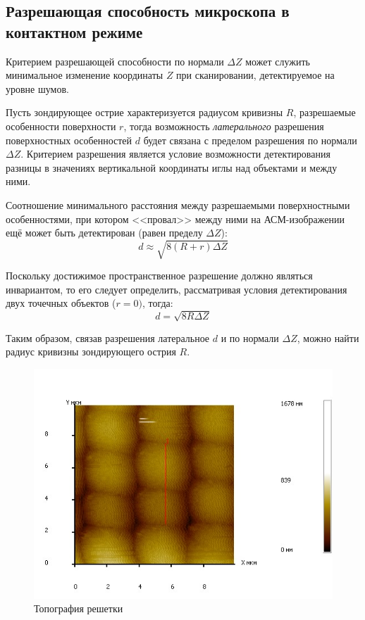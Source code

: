 \documentclass[a4paper, 12pt]{article}
\begin{document}
	\subsection{Разрешающая способность микроскопа в контактном режиме}
	Критерием разрешающей способности по нормали $\Delta Z$ может служить минимальное изменение координаты $Z$ при сканировании, детектируемое на уровне шумов.\par
	Пусть зондирующее острие характеризуется радиусом кривизны $R$, разрешаемые особенности поверхности $r$, тогда возможность \textit{латерального} разрешения поверхностных особенностей $d$ будет связана с пределом разрешения по нормали $\Delta Z$. Критерием разрешения является условие возможности детектирования разницы в значениях вертикальной координаты иглы над объектами и между ними.\par
	Соотношение минимального расстояния между разрешаемыми поверхностными особенностями, при котором <<провал>> между ними на АСМ-изображении ещё может быть детектирован (равен пределу $\Delta Z$):
	\begin{equation*}
		d\approx\sqrt{8(R+r)\Delta Z}
	\end{equation*}
	\par
	Поскольку достижимое пространственное разрешение должно являться инвариантом, то его следует определить, рассматривая условия детектирования двух точечных объектов ($r = 0)$, тогда:
	\begin{equation*}
		d=\sqrt{8R\Delta Z}
	\end{equation*}
	\par
	Таким образом, связав разрешения латеральное $d$ и по нормали $\Delta Z$, можно найти радиус кривизны зондирующего острия $R$.
	\begin{figure}[!htb]
		\centering
		\includegraphics[scale=0.7]{20.11.2018/topview1.jpg}
		\caption{Топография решетки}
		\label{pic1}
	\end{figure}
\end{document}
